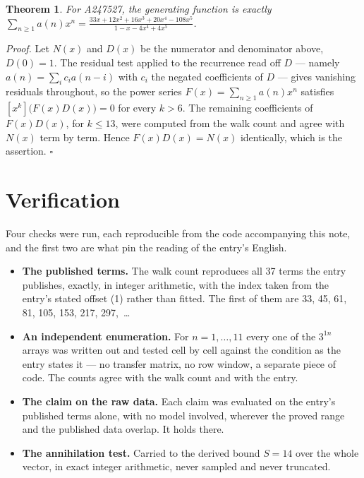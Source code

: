 \documentclass[11pt]{article}
\newtheorem{theorem}{Theorem}
\theoremstyle{definition}
\begin{document}
\begin{theorem} For A247527, the generating function is exactly $\sum_{n\ge 1} a(n)x^n = \frac{33x + 12x^{2} + 16x^{3} + 20x^{4} - 108x^{5}}{1 - x - 4x^{4} + 4x^{5}}$.\end{theorem}

{\itshape Proof.} Let $N(x)$ and $D(x)$ be the numerator and denominator above, $D(0)=1$. The residual test applied to the recurrence read off $D$ --- namely $a(n) = \sum_i c_i a(n-i)$ with $c_i$ the negated coefficients of $D$ --- gives vanishing residuals throughout, so the power series $F(x)=\sum_{n\ge 1}a(n)x^n$ satisfies $[x^k]\bigl(F(x)D(x)\bigr) = 0$ for every $k > 6$. The remaining coefficients of $F(x)D(x)$, for $k \le 13$, were computed from the walk count and agree with $N(x)$ term by term. Hence $F(x)D(x) = N(x)$ identically, which is the assertion. $\square$

\section{Verification}

Four checks were run, each reproducible from the code accompanying this note, and the first two are what pin the reading of the entry's English.

\begin{itemize}

\item {\bfseries The published terms.} The walk count reproduces all 37 terms the entry publishes, exactly, in integer arithmetic, with the index taken from the entry's stated offset (1) rather than fitted. The first of them are 33, 45, 61, 81, 105, 153, 217, 297,~\dots

\item {\bfseries An independent enumeration.} For $n = 1,\dots,11$ every one of the $3^{1n}$ arrays was written out and tested cell by cell against the condition as the entry states it --- no transfer matrix, no row window, a separate piece of code. The counts agree with the walk count and with the entry.

\item {\bfseries The claim on the raw data.} Each claim was evaluated on the entry's published terms alone, with no model involved, wherever the proved range and the published data overlap. It holds there.

\item {\bfseries The annihilation test.} Carried to the derived bound $S = 14$ over the whole vector, in exact integer arithmetic, never sampled and never truncated.

\end{itemize}
\end{document}
